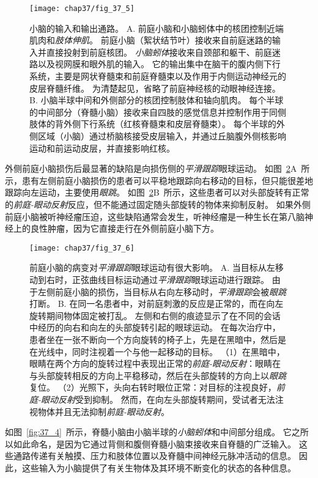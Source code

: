 \begin{figure}[htbp]
	\centering
	\texttt{[image: chap37/fig\_37\_5]}
	\caption{小脑的输入和输出通路。
		A. 前庭小脑和小脑蚓体中的核团控制近端肌肉和\textit{肢体伸肌}。
		前庭小脑（絮状结节叶）接收来自前庭迷路的输入并直接投射到前庭核团。
		\textit{小脑蚓体}接收来自颈部和躯干、前庭迷路以及视网膜和眼外肌的输入。
		它的输出集中在脑干的腹内侧下行系统，主要是网状脊髓束和前庭脊髓束以及作用于内侧运动神经元的皮层脊髓纤维。
		为清楚起见，省略了前庭神经核的动眼神经连接。
		B. 小脑半球中间和外侧部分的核团控制肢体和轴向肌肉。
		每个半球的中间部分（脊髓小脑）接收来自四肢的感觉信息并控制作用于同侧肢体的背外侧下行系统（红核脊髓束和皮层脊髓束）。
		每个半球的外侧区域（小脑）通过桥脑核接受皮层输入，并通过丘脑腹外侧核影响运动和前运动皮层，并直接影响红核。}
	\label{fig:37_5}
\end{figure}


外侧前庭小脑损伤后最显著的缺陷是向损伤侧的\textit{平滑跟踪}眼球运动。
如图~\ref{fig:37_6}A~所示，患有左侧前庭小脑损伤的患者可以平稳地跟踪向右移动的目标，但只能很差地跟踪向左运动，主要使用\textit{眼跳}。
如图~\ref{fig:37_6}B~所示，这些患者可以对头部旋转有正常的\textit{前庭-眼动反射}反应，但不能通过固定随头部旋转的物体来抑制反射。
如果外侧前庭小脑被听神经瘤压迫，这些缺陷通常会发生，听神经瘤是一种生长在第八脑神经上的良性肿瘤，因为它直接走行在外侧前庭小脑下方。


\begin{figure}[htbp]
	\centering
	\texttt{[image: chap37/fig\_37\_6]}
	\caption{前庭小脑的病变对\textit{平滑跟踪}眼球运动有很大影响。
		A. 当目标从左移动到右时，正弦曲线目标运动通过\textit{平滑跟踪}眼球运动进行跟踪。
		由于左侧前庭小脑的损伤，当目标从右向左移动时，\textit{平滑跟踪}会被\textit{眼跳}打断。
		B. 在同一名患者中，对前庭刺激的反应是正常的，而在向左旋转期间物体固定被打乱。
		左侧和右侧的痕迹显示了在不同的会话中经历的向右和向左的头部旋转引起的眼球运动。
		在每次治疗中，患者坐在一张不断向一个方向旋转的椅子上，先是在黑暗中，然后是在光线中，同时注视着一个与他一起移动的目标。
		（1）在黑暗中，眼睛在两个方向的旋转过程中表现出正常的\textit{前庭-眼动反射}：眼睛在与头部旋转相反的方向上平稳移动，然后在头部旋转的方向上以\textit{眼跳}复位。
		（2）光照下，头向右转时眼位正常：对目标的注视良好，\textit{前庭-眼动反射}受到抑制。
		然而，在向左头部旋转期间，受试者无法注视物体并且无法抑制\textit{前庭-眼动反射}。}
	\label{fig:37_6}
\end{figure}


如图~\ref{fig:37_4}~所示，脊髓小脑由小脑半球的\textit{小脑蚓体}和中间部分组成。
它之所以如此命名，是因为它通过背侧和腹侧脊髓小脑束接收来自脊髓的广泛输入。
这些通路传递有关触摸、压力和肢体位置以及脊髓中间神经元脉冲活动的信息。
因此，这些输入为小脑提供了有关生物体及其环境不断变化的状态的各种信息。


